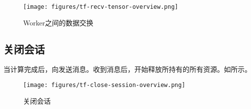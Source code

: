 \begin{content}
\begin{figure}[!h]
\centering
\texttt{[image: figures/tf-recv-tensor-overview.png]}
\caption{Worker之间的数据交换}
 \label{fig:tf-recv-tensor-overview}
\end{figure}

\subsection{关闭会话}

当计算完成后，向发送消息。收到消息后，开始释放所持有的所有资源。如所示。

\begin{figure}[!h]
\centering
\texttt{[image: figures/tf-close-session-overview.png]}
\caption{关闭会话}
 \label{fig:tf-close-session-overview}
\end{figure}

\end{content}
